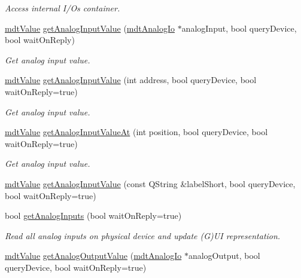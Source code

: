 \begin{DoxyCompactItemize}
\begin{DoxyCompactList}\small\item\em Access internal I/\-Os container. \end{DoxyCompactList}\item 
\hyperlink{classmdt_value}{mdt\-Value} \hyperlink{classmdt_multi_io_device_ac39f01b071d5b7c16e18db298160134d}{get\-Analog\-Input\-Value} (\hyperlink{classmdt_analog_io}{mdt\-Analog\-Io} $\ast$analog\-Input, bool query\-Device, bool wait\-On\-Reply)
\begin{DoxyCompactList}\small\item\em Get analog input value. \end{DoxyCompactList}\item 
\hyperlink{classmdt_value}{mdt\-Value} \hyperlink{classmdt_multi_io_device_a852e4a4cbbdb2d382de9196526a2b0b2}{get\-Analog\-Input\-Value} (int address, bool query\-Device, bool wait\-On\-Reply=true)
\begin{DoxyCompactList}\small\item\em Get analog input value. \end{DoxyCompactList}\item 
\hyperlink{classmdt_value}{mdt\-Value} \hyperlink{classmdt_multi_io_device_a8b4db7303086ffd9c2a0d760b0046f6c}{get\-Analog\-Input\-Value\-At} (int position, bool query\-Device, bool wait\-On\-Reply=true)
\begin{DoxyCompactList}\small\item\em Get analog input value. \end{DoxyCompactList}\item 
\hyperlink{classmdt_value}{mdt\-Value} \hyperlink{classmdt_multi_io_device_a5134bf7dcca2da9b3cfcb3601c8b5d25}{get\-Analog\-Input\-Value} (const Q\-String \&label\-Short, bool query\-Device, bool wait\-On\-Reply=true)
\item 
bool \hyperlink{classmdt_multi_io_device_a6a2f1e6538f09318b8e7d7fe220195e9}{get\-Analog\-Inputs} (bool wait\-On\-Reply=true)
\begin{DoxyCompactList}\small\item\em Read all analog inputs on physical device and update (G)U\-I representation. \end{DoxyCompactList}\item 
\hyperlink{classmdt_value}{mdt\-Value} \hyperlink{classmdt_multi_io_device_a5ec427ff1979b14f7882219f920e0284}{get\-Analog\-Output\-Value} (\hyperlink{classmdt_analog_io}{mdt\-Analog\-Io} $\ast$analog\-Output, bool query\-Device, bool wait\-On\-Reply=true)

\end{DoxyCompactItemize}

